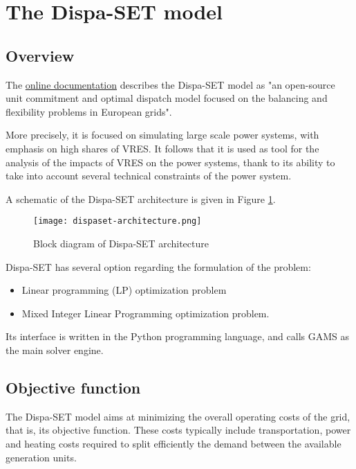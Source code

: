 \section{The Dispa-SET model}

\subsection{Overview}

The \href{http://www.dispaset.eu/en/latest/}{online documentation} describes the Dispa-SET \cite{dispaset} model as "an open-source unit commitment and optimal dispatch model focused on the balancing and flexibility problems in European grids".

More precisely, it is focused on simulating large scale power systems, with emphasis on high shares of VRES. It follows that it is used as tool for the analysis of the impacts of VRES on the power systems, thank to its ability to take into account several technical constraints of the power system.

A schematic of the Dispa-SET architecture is given in Figure \ref{dispaset-architecture}.

\begin{figure}[h]
    \texttt{[image: dispaset-architecture.png]}
    \caption{Block diagram of Dispa-SET architecture}
    \label{dispaset-architecture}
\end{figure}

Dispa-SET has several option regarding the formulation of the problem:
\begin{itemize}
    \item Linear programming (LP) optimization problem
    \item Mixed Integer Linear Programming optimization problem.
\end{itemize}

Its interface is written in the Python programming language, and calls GAMS \cite{GAMS} as the main solver engine.

\subsection{Objective function}

The Dispa-SET model aims at minimizing the overall operating costs of the grid, that is, its objective function. These costs typically include transportation, power and heating costs required to split efficiently the demand between the available generation units.

